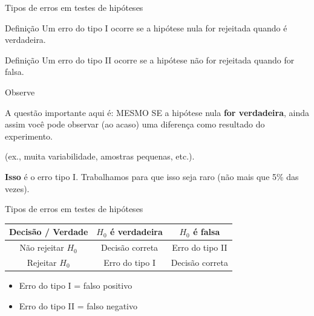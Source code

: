 \documentclass{beamer}
\begin{document}
\begin{frame}{Tipos de erros em testes de hipóteses}
  \begin{block}{Definição}
    Um \alert{erro do tipo I} ocorre se a hipótese nula for rejeitada
    quando é verdadeira.
  \end{block}
  \begin{block}{Definição}
    Um \alert{erro do tipo II} ocorre se a hipótese não for rejeitada
    quando for falsa.
  \end{block}
\end{frame}

\begin{frame}{Observe}
  \begin{block}{A questão importante aqui é:}
    MESMO SE a hipótese nula {\bf for verdadeira}, ainda assim você pode observar (ao acaso) uma diferença como resultado do experimento.

    \bigskip
    (ex., muita variabilidade, amostras pequenas, etc.).

    \bigskip
    {\bf Isso} é o erro tipo I. Trabalhamos para que isso seja raro (não mais que 5\% das vezes).
  \end{block}
\end{frame}

\begin{frame}{Tipos de erros em testes de hipóteses}
  \begin{block}{}
    \begin{tabular}{c||c|c}
      Decisão / Verdade & $H_0$ é verdadeira & $H_0$ é falsa \\
      \hline
      \hline
      Não rejeitar $H_0$ & Decisão correta & Erro do tipo II\\
      \hline
      Rejeitar $H_0$ & Erro do tipo I & Decisão correta\\
    \end{tabular}
  \end{block}
  \begin{itemize}
  \item Erro do tipo I = falso positivo
  \item Erro do tipo II = falso negativo
  \end{itemize}
\end{frame}
\end{document}
